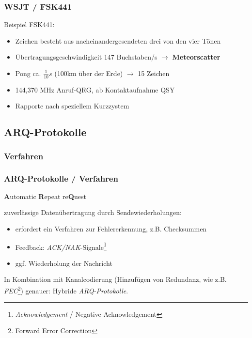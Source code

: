 \begin{frame}
    \frametitle{WSJT / FSK441}

    Beispiel FSK441:

    \begin{itemize}
        \item Zeichen besteht aus nacheinandergesendeten drei von den vier Tönen
        \item Übertragungsgeschwindigkeit 147 Buchstaben/s $\rightarrow$
              \textbf{Meteorscatter}
        \item Pong ca. $\frac{1}{10}s$ (100km über der Erde) $\rightarrow$ 15 Zeichen
        \item 144,370 MHz Anruf-QRG, ab Kontaktaufnahme QSY
        \item Rapporte nach speziellem Kurzzystem
    \end{itemize}

\end{frame}

\subsection{ARQ-Protokolle}

\subsubsection{Verfahren}

\begin{frame}
    \frametitle{ARQ-Protokolle / Verfahren}

    \textbf{A}utomatic \textbf{R}epeat re\textbf{Q}uest

    zuverlässige Datenübertragung durch Sendewiederholungen:

    \begin{itemize}
        \item erfordert ein Verfahren zur Fehlererkennung, z.B. Checksummen
        \item Feedback: \emph{ACK/NAK}-Signale\footnote{\emph{Acknowledgement} /
              {Negative Acknowledgement}}
        \item ggf. Wiederholung der Nachricht
    \end{itemize}

    In Kombination mit Kanalcodierung (Hinzufügen von Redundanz, wie z.B.
    \emph{FEC}\footnote{Forward Error Correction}) genauer: Hybride \emph{ARQ-Protokolle}.

\end{frame}

